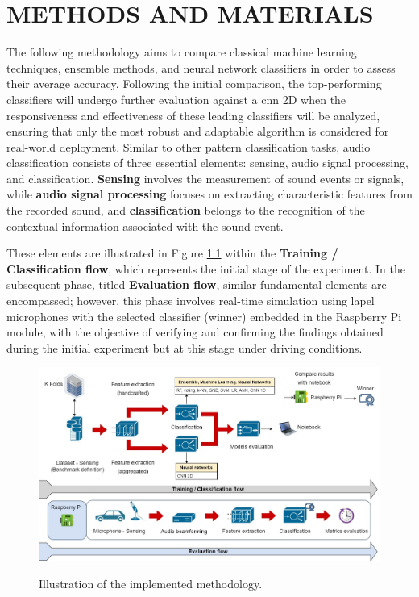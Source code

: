 \chapter{METHODS AND MATERIALS}
\label{chp:methods}

The following methodology aims to compare classical machine learning techniques, ensemble methods, and neural network classifiers in order to assess their average accuracy. Following the initial comparison, the top-performing classifiers will undergo further evaluation against a \gls{cnn} 2D when the responsiveness and effectiveness of these leading classifiers will be analyzed, ensuring that only the most robust and adaptable algorithm is considered for real-world deployment. Similar to other pattern classification tasks, audio classification consists of three essential elements: sensing, audio signal processing, and classification. \textbf{Sensing} involves the measurement of sound events or signals, while \textbf{audio signal processing} focuses on extracting characteristic features from the recorded sound, and \textbf{classification} belongs to the recognition of the contextual information associated with the sound event.

These elements are illustrated in Figure \ref{fig:methodology_illustration} within the \textbf{Training / Classification flow}, which represents the initial stage of the experiment. In the subsequent phase, titled \textbf{Evaluation flow}, similar fundamental elements are encompassed; however, this phase involves real-time simulation using lapel microphones with the selected classifier (winner) embedded in the Raspberry Pi module, with the objective of verifying and confirming the findings obtained during the initial experiment but at this stage under driving conditions. 

\begin{figure}[htbp]
    \raggedright
        \caption{Illustration of the implemented methodology.}
        \includegraphics[width=.95\textwidth]{resources/images/050-methods/Methods_diagram.jpg}
        \label{fig:methodology_illustration}
\end{figure}

